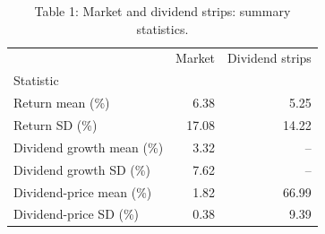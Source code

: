 \begin{table}
\caption{Table 1: Market and dividend strips: summary statistics.}
\label{tab:replication_1}
\begin{tabular}{lrr}
\toprule
 & Market & Dividend strips \\
Statistic &  &  \\
\midrule
Return mean (\%) & 6.38 & 5.25 \\
Return SD (\%) & 17.08 & 14.22 \\
Dividend growth mean (\%) & 3.32 & -- \\
Dividend growth SD (\%) & 7.62 & -- \\
Dividend-price mean (\%) & 1.82 & 66.99 \\
Dividend-price SD (\%) & 0.38 & 9.39 \\
\bottomrule
\end{tabular}
\end{table}
